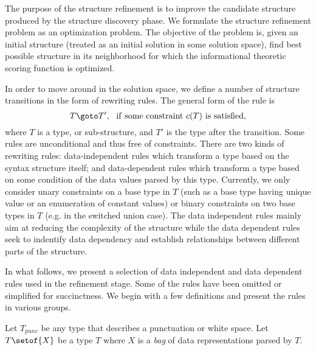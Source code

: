 The purpose of the structure refinement is to improve
the candidate structure produced by the structure discovery phase. We
formulate the structure refinement problem as an optimization problem. The
objective of the problem is, given an initial structure (treated as
an initial solution in some solution space), find best possible structure
in its neighborhood for which the informational theoretic scoring function
is optimized.

In order to move around in the solution space, we define a number of structure
transitions in the form of rewriting rules. The general form of the rule is
\[T \goto T', ~~ {\rm if~ some~ constraint~} c(T)~ {\rm is~ satisfied,}\]
where $T$ is a type, or sub-structure, and $T'$ is the type after the
transition.  Some rules are unconditional and thus free of constraints.
There are two kinds of rewriting rules: data-independent rules which
transform a type based on the syntax structure itself; and data-dependent
rules which transform a type based on some condition of the data values
parsed by this type. Currently, we only consider unary constraints on a base
type in $T$ (such as a base type having unique value or an enumeration of constant
values) or binary constraints on two base types in $T$ (e.g. in the switched
union case). The data independent rules mainly aim at reducing the complexity
of the structure while the data dependent rules seek to indentify data
dependency and establish relationships between different parts 
of the structure.

In what follows, we present a selection of
data independent and data dependent rules used in the refinement stage.
Some of the rules have been omitted or simplified for succinctness.
We begin with a few definitions and present the rules in various groups.

Let $T_{punc}$ be any type that describes a punctuation or white space.
Let $T\setof{X}$ be a type $T$ where $X$ is a {\em bag} of data representations
parsed by $T$.

